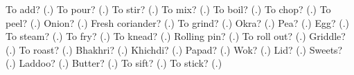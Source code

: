 \begin{tcolorbox}[breakable,colback=teal!4,colframe=teal!35!black,title={Before you move on}]
To add? (\textbf{}.) To pour? (\textbf{}.) To stir? (\textbf{}.) To mix? (\textbf{}.) To boil? (\textbf{}.) To chop? (\textbf{}.) To peel? (\textbf{}.) Onion? (\textbf{}.) Fresh coriander? (\textbf{}.) To grind? (\textbf{}.) Okra? (\textbf{}.) Pea? (\textbf{}.) Egg? (\textbf{}.) To steam? (\textbf{}.) To fry? (\textbf{}.) To knead? (\textbf{}.) Rolling pin? (\textbf{}.) To roll out? (\textbf{}.) Griddle? (\textbf{}.) To roast? (\textbf{}.) Bhakhri? (\textbf{}.) Khichdi? (\textbf{}.) Papad? (\textbf{}.) Wok? (\textbf{}.) Lid? (\textbf{}.) Sweets? (\textbf{}.) Laddoo? (\textbf{}.) Butter? (\textbf{}.) To sift? (\textbf{}.) To stick? (\textbf{}.)
\end{tcolorbox}

